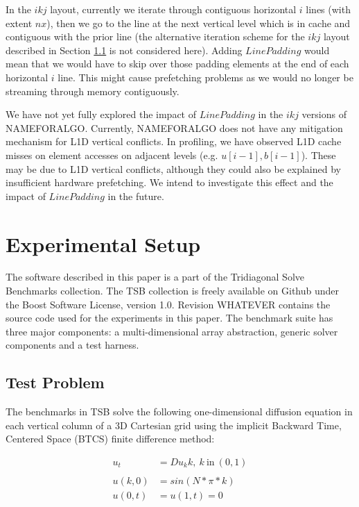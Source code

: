 \documentclass[conference]{IEEEtran}
\begin{document}
In the \(ikj\) layout, currently we iterate through contiguous horizontal \(i\)
lines (with extent \(nx\)), then we go to the line at the next vertical level
which is in cache and contiguous with the prior line (the alternative iteration
scheme for the \(ikj\) layout described in Section \ref{} is not considered
here). Adding \(LinePadding\) would mean that we would have to skip over those
padding elements at the end of each horizontal \(i\) line. This might cause
prefetching problems as we would no longer be streaming through memory
contiguously.

We have not yet fully explored the impact of \(LinePadding\) in the \(ikj\)
versions of NAMEFORALGO. Currently, NAMEFORALGO does not have any mitigation
mechanism for L1D vertical conflicts. In profiling, we have observed L1D cache
misses on element accesses on adjacent levels (e.g. \(u[i-1], b[i-1]\)). These
may be due to L1D vertical conflicts, although they could also be explained by
insufficient hardware prefetching. We intend to investigate this effect and the
impact of \(LinePadding\) in the future.

\section{Experimental Setup}
The software described in this paper is a part of the Tridiagonal Solve
Benchmarks collection. The TSB collection is freely available on Github under
the Boost Software License, version 1.0. Revision WHATEVER contains the source
code used for the experiments in this paper. The benchmark suite has three
major components: a multi-dimensional array abstraction, generic solver
components and a test harness.

\subsection{Test Problem}

The benchmarks in TSB solve the following one-dimensional diffusion equation in
each vertical column of a 3D Cartesian grid using the implicit Backward Time,
Centered Space (BTCS) finite difference method:

\begin{align*}
u_t &= Du_kk, \: k \: \text{in} \: (0, 1) \\
                                          \\
u(k, 0) &= sin(N * \pi * k)               \\
u(0, t) &= u(1, t) = 0
\end{align*}
\end{document}
